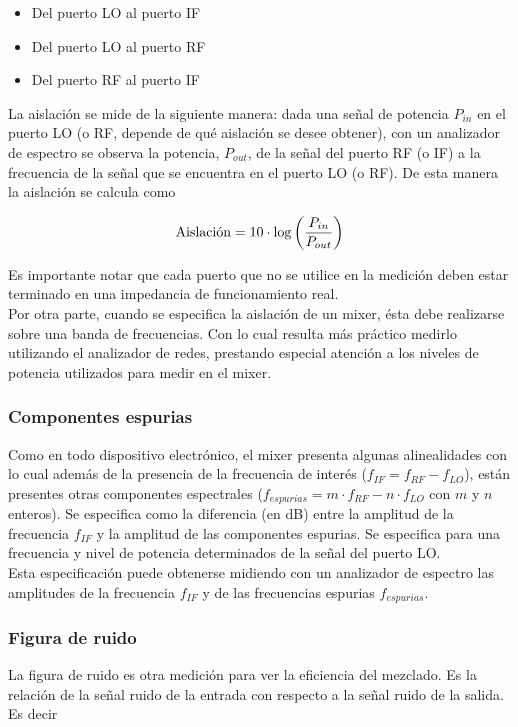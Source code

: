 \documentclass[a4paper,10pt]{article}
\begin{document}
	\begin{itemize}
		\item Del puerto LO al puerto IF
		\item Del puerto LO al puerto RF
		\item Del puerto RF al puerto IF
	\end{itemize}
	
	\indent La aislaci\'on se mide de la siguiente manera: dada una se\~nal de 
	potencia $P_{in}$ en el puerto LO (o RF, depende de qu\'e aislaci\'on se 
	desee obtener), con un analizador de espectro se observa la potencia, 
	$P_{out}$, de la señal del puerto RF (o IF) a la frecuencia de la señal que 
	se encuentra en el puerto LO (o RF). De esta manera la aislaci\'on se 
	calcula como		
	
	$$\textmd{Aislaci\'on}=10\cdot\log\left(\frac{P_{in}}{P_{out}}\right)$$
		
	\indent Es importante notar que cada puerto que no se utilice en la 
	medici\'on deben estar terminado en una impedancia de funcionamiento real.\\
	\indent	Por otra parte, cuando se especifica la aislaci\'on de un mixer, 
	\'esta debe realizarse sobre una banda de frecuencias. Con lo cual resulta 
	m\'as pr\'actico medirlo utilizando el analizador de redes, prestando 
	especial atenci\'on a los niveles de potencia utilizados para medir en el 
	mixer.
	
	\subsubsection{Componentes espurias}\label{todosputos}
	\indent Como en todo dispositivo electr\'onico, el mixer presenta algunas 
	alinealidades con lo cual adem\'as de la presencia de la frecuencia de 
	inter\'es ($f_{IF}=f_{RF}-f_{LO}$), est\'an presentes otras componentes 
	espectrales ($f_{espurias}=m\cdot f_{RF}-n\cdot f_{LO}$ con $m$ y $n$ 
	enteros). Se especifica como la diferencia (en dB) entre la amplitud de la 
	frecuencia $f_{IF}$ y la amplitud de las componentes espurias. Se especifica
	para una frecuencia y nivel de potencia determinados de la señal del puerto 
	LO. \\
	\indent Esta especificaci\'on puede obtenerse midiendo con un analizador de 
	espectro las amplitudes de la frecuencia $f_{IF}$ y de las frecuencias 
	espurias $f_{espurias}$.

	\subsubsection{Figura de ruido}
	\indent La figura de ruido es otra medición para ver la eficiencia del 
	mezclado. Es la relación de la señal ruido de la entrada con respecto a
	la señal ruido de la salida. Es decir
		
\end{document}
